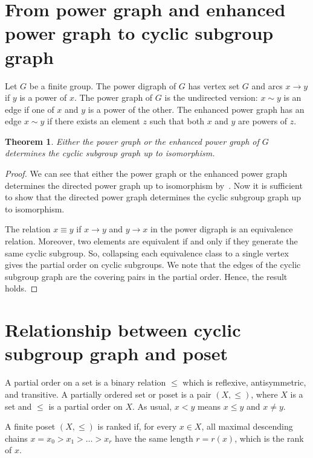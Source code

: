 \documentclass[11pt,twoside]{amsart}
\newtheorem{theorem}{Theorem}[section]
\begin{document}
    \section{From power graph and enhanced power graph to cyclic subgroup graph}\label{sec:relationship}
    Let $G$ be a finite group. The power digraph of $G$ has vertex set $G$ and arcs $x\rightarrow y$ if $y$ is a power of $x$. The power graph of $G$ is the undirected version:
$x\sim y$ is an edge if one of $x$ and $y$ is a power of the other. The enhanced
power graph has an edge $x\sim y$ if there exists an element $z$ such that both $x$ and $y$ are powers of $z$.
\begin{theorem}
    Either the power graph or the enhanced power graph of $G$ determines the cyclic subgroup graph up to isomorphism.
\end{theorem}
\begin{proof}
   We can see that either the power graph or the enhanced power graph determines the directed power graph up to isomorphism by~\cite{cameron2010power,zahirovic2020study,bubboloni2025}. Now it is sufficient to show that the directed power graph determines the cyclic subgroup graph up to isomorphism.

   The relation $x\equiv y$ if $x\rightarrow y$ and $y\rightarrow x$ in the power digraph is an equivalence relation. Moreover, two elements are equivalent if and only if they generate the same cyclic subgroup. So, collapsing each equivalence class to a
single vertex gives the partial order on cyclic subgroups. We note that the edges of the cyclic subgroup
graph are the covering pairs in the partial order. Hence, the result holds.
\end{proof}
\section{Relationship between cyclic subgroup graph and poset}\label{sec:poset}
A partial order on a set is a binary relation $\leq$ which is reflexive,
antisymmetric, and transitive. A partially ordered set or poset is a pair $(X,\leq)$, where $X$ is a set and $\leq$ is a partial order on $X$. As usual, $x<y$ means $x\leq y$ and
$x\not =y$.

A finite poset $(X,\leq)$ is ranked if, for every $x\in X$, all maximal descending chains $x=x_0>x_1>\dots>x_r$ have the same length $r=r(x)$, which is the
rank of $x$.
\end{document}
